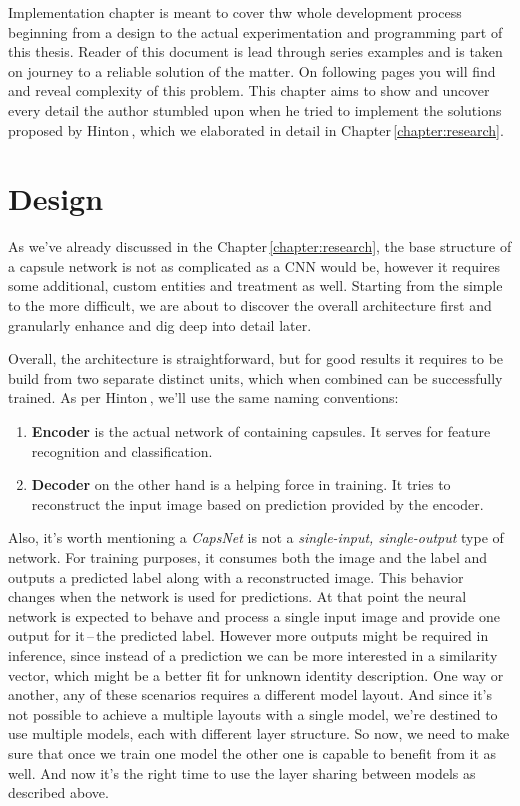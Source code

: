 Implementation chapter is meant to cover thw whole development process beginning from a design to the actual experimentation and programming part of this thesis. Reader of this document is lead through series examples and is taken on journey to a reliable solution of the matter. On following pages you will find and reveal complexity of this problem. This chapter aims to show and uncover every detail the author stumbled upon when he tried to implement the solutions proposed by Hinton\,\cite{capsule}, which we elaborated in detail in Chapter\,\ref{chapter:research}.

\section{Design}
\label{s:design}

As we've already discussed in the Chapter\,\ref{chapter:research}, the base structure of a capsule network is not as complicated as a CNN would be, however it requires some additional, custom entities and treatment as well. Starting from the simple to the more difficult, we are about to discover the overall architecture first and granularly enhance and dig deep into detail later.

Overall, the architecture is straightforward, but for good results it requires to be build from two separate distinct units, which when combined can be successfully trained. As per Hinton\,\cite{capsule}, we'll use the same naming conventions:

\begin{enumerate}
    \item \textbf{Encoder} is the actual network of containing capsules. It serves for feature recognition and classification.
    \item \textbf{Decoder} on the other hand is a helping force in training. It tries to reconstruct the input image based on prediction provided by the encoder.
\end{enumerate}

Also, it's worth mentioning a \textit{CapsNet} is not a \textit{single-input, single-output} type of network. For training purposes, it consumes both the image and the label and outputs a predicted label along with a reconstructed image. This behavior changes when the network is used for predictions. At that point the neural network is expected to behave and process a single input image and provide one output for it\,--\,the predicted label. However more outputs might be required in inference, since instead of a prediction we can be more interested in a similarity vector, which might be a better fit for unknown identity description. One way or another, any of these scenarios requires a different model layout. And since it's not possible to achieve a multiple layouts with a single model, we're destined to use multiple models, each with different layer structure. So now, we need to make sure that once we train one model the other one is capable to benefit from it as well. And now it's the right time to use the layer sharing between models as described above.

